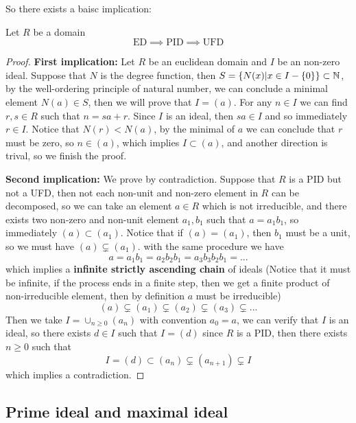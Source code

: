 \documentclass[en,geye,blue,normal,12pt]{elegantnote}
\begin{document}
So there exists a baisc implication:
\begin{proposition}
    Let \(R\) be a domain 
    \[\text{ED} \implies \text{PID} \implies \text{UFD} \]

    \begin{proof}
        \textbf{First implication:} Let \(R\) be an euclidean domain and \(I   \) be an non-zero ideal. Suppose that \(N\) is the degree function, then \(S = \{N(x) | x \in I-\{0\}\} \subset \mathbb{N}\), by the well-ordering principle of natural number, we can conclude a minimal element \(N(a) \in S\), then we will prove that \(I = (a)\). For any \(n \in I\) we can find \(r,s \in R\) such that \(n = sa+r\). Since \(I\) is an ideal, then \(sa \in I\) and so immediately \(r \in I\). Notice that \(N(r) < N(a)\), by the minimal of \(a\) we can conclude that \(r\) must be zero, so \(n \in (a)\), which implies \(I \subset (a)\), and another direction is trival, so we finish the proof.
        
        \textbf{Second implication:} We prove by contradiction. Suppose that \(R\) is a PID but not a UFD, then not each non-unit and non-zero element in \(R\) can be decomposed, so we can take an element \(a \in R\) which is not irreducible, and there exists two non-zero and non-unit element \(a_1,b_1\) such that \(a = a_1b_1\), so immediately \((a) \subset (a_1)\). Notice that if \((a) = (a_1)\), then \(b_1\) must be a unit, so we must have \((a) \subsetneq (a_1)\). with the same procedure we have
        \[a = a_1b_1 = a_2b_2b_1  = a_3b_3b_2b_1 = ...\]
        which implies a \textbf{infinite strictly ascending chain} of ideals (Notice that it must be infinite, if the process ends in a finite step, then we get a finite product of non-irreducible element, then by definition \(a\) must be irreducible)
        \[(a) \subsetneq (a_1) \subsetneq (a_2) \subsetneq (a_3) \subsetneq ...\]
        Then we take \(I = \cup_{n \geq 0}(a_n)\) with convention \(a_0 = a\), we can verify that \(I\) is an ideal, so there exists \(d \in I\) such that \(I = (d)\) since \(R\) is a PID, then there exists \(n \geq 0\) such that
        \[I = (d) \subset (a_n) \subsetneq (a_{n+1}) \subsetneq I\]
        which implies a contradiction.
    \end{proof}
\end{proposition}

\subsection{Prime ideal and maximal ideal}
\end{document}
